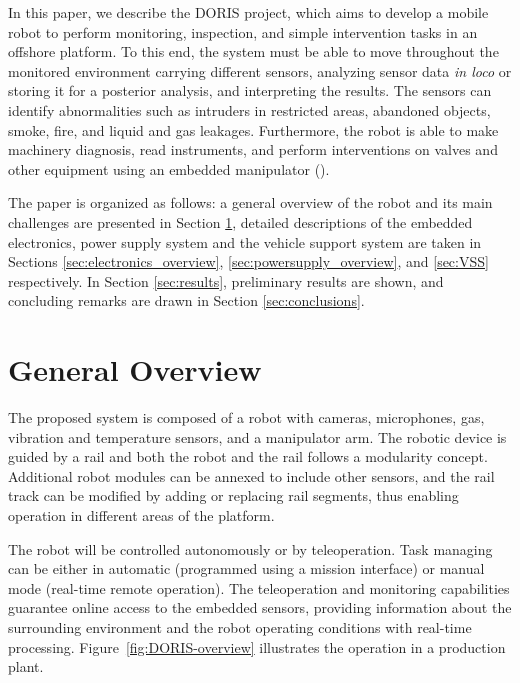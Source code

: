 \documentclass{ifacconf}
\begin{document}
In this paper, we describe the DORIS project, which aims to develop a mobile
robot to perform monitoring, inspection, and simple intervention tasks in an
offshore platform. To this end, the system must be able to move throughout the
monitored environment carrying different sensors, analyzing sensor data
\emph{in loco} or storing it for a posterior analysis, and interpreting the
results. The sensors can identify abnormalities such as intruders in restricted
areas, abandoned objects, smoke, fire, and liquid and gas leakages.
Furthermore, the robot is able to make machinery diagnosis, read instruments,
and perform interventions on valves and other equipment using an embedded
manipulator (\cite{cba}).

The paper is organized as follows: a general overview of the robot and its main
challenges are presented in Section \ref{sec:general_overview}, detailed
descriptions of the embedded electronics, power
supply system and the vehicle support system are taken in
Sections \ref{sec:electronics_overview}, \ref{sec:powersupply_overview}, and
\ref{sec:VSS} respectively.
In Section \ref{sec:results}, preliminary results are shown, and concluding
remarks are drawn in Section \ref{sec:conclusions}.

\section{General Overview}\label{sec:general_overview}

The proposed system is composed of a robot with cameras, microphones, gas,
vibration and temperature sensors, and a manipulator arm. The robotic device is
guided by a rail and both the robot and the rail follows a modularity concept.
Additional robot modules can be annexed to include other sensors, and the rail
track can be modified by adding or replacing rail segments, thus enabling
operation in different areas of the platform.

The robot will be controlled autonomously or by teleoperation. Task managing
can be either in automatic (programmed using a mission interface) or manual
mode (real-time remote operation). The teleoperation and monitoring
capabilities guarantee online access to the embedded sensors, providing
information about the surrounding environment and the robot operating
conditions with real-time processing. Figure~\ref{fig:DORIS-overview}
illustrates the operation in a production plant.
\end{document}
